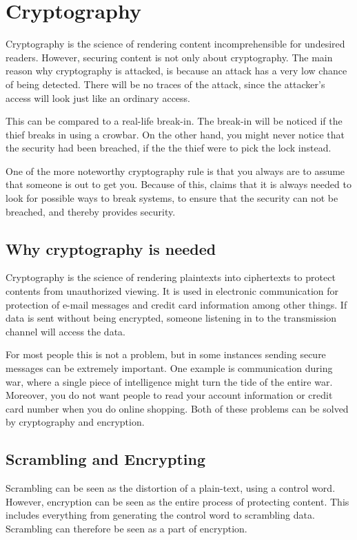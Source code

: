 \chapter{Cryptography}\label{ch:Scrambling}
Cryptography is the science of rendering content incomprehensible for 
undesired readers. However, securing content is not only about 
cryptography. The main reason why cryptography is attacked, is because 
an attack has a very low chance of being detected. There will be no 
traces of the attack, since the attacker’s access will look just like 
an ordinary access. \citep{Schneier:2003}

This can be compared to a real-life break-in. The break-in will be 
noticed if the thief breaks in using a crowbar. On the other hand, you 
might never notice that the security had been breached, if the the 
thief were to pick the lock instead. \citep{Schneier:2003}

One of the more noteworthy cryptography rule is that you always are to 
assume that someone is out to get you. Because of this, 
\citet[pp. 12--14]{Schneier:2003} claims that it is always needed to 
look for possible ways to break systems, to ensure that the security 
can not be breached, and thereby provides security.

\section{Why cryptography is needed}
Cryptography is the science of rendering plaintexts into ciphertexts to 
protect contents from unauthorized viewing. It is used in electronic 
communication for protection of e-mail messages and credit card 
information among other things. If data is sent without being encrypted,
someone listening in to the transmission channel will access the data.

For most people this is not a problem, but in some instances sending 
secure messages can be extremely important. One example is 
communication during war, where a single piece of intelligence might 
turn the tide of the entire war. Moreover, you do not want people to 
read your account information or credit card number when you do online 
shopping. Both of these problems can be solved by cryptography and 
encryption.
\section{Scrambling and Encrypting}
Scrambling can be seen as the distortion of a plain-text, using a 
control word. However, encryption can be seen as the entire process of 
protecting content. This includes everything from generating the 
control word to scrambling data. Scrambling can therefore be seen as a 
part of encryption.

